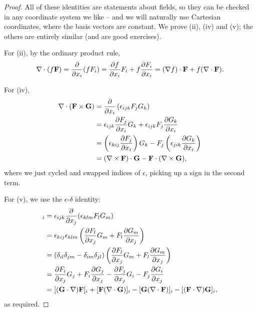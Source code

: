 \documentclass[a4paper]{scrartcl}
\begin{document}
\begin{proof}
	All of these identities are statements about fields, so they can be checked in any coordinate system we like -- and we will naturally use Cartesian coordinates, where the basis vectors are constant. We prove (ii), (iv) and (v); the others are entirely similar (and are good exercises).

	For (ii), by the ordinary product rule,
	$$
	\nabla \cdot (f \mathbf{F}) = \frac{\partial}{\partial x_i}(f F_i) = \frac{\partial f}{\partial x_i} F_i + f \frac{\partial F_i}{\partial x_i} = (\nabla f) \cdot \mathbf{F} + f (\nabla \cdot \mathbf{F}).
	$$

	For (iv),
	\begin{align*}
		\nabla \cdot (\mathbf{F} \times \mathbf{G}) &= \frac{\partial}{\partial x_i} \left(\epsilon_{ijk} F_j G_k\right) \\
		&= \epsilon_{ijk} \frac{\partial F_j}{\partial x_i} G_k + \epsilon_{ijk} F_j \frac{\partial G_k}{\partial x_i} \\
		&= \left(\epsilon_{kij} \frac{\partial F_j}{\partial x_i}\right) G_k - F_j \left(\epsilon_{jik} \frac{\partial G_k}{\partial x_i}\right) \\
		&= (\nabla \times \mathbf{F}) \cdot \mathbf{G} - \mathbf{F} \cdot (\nabla \times \mathbf{G}),
	\end{align*}
	where we just cycled and swapped indices of $\epsilon$, picking up a sign in the second term.

	For (v), we use the $\epsilon$-$\delta$ identity:
	\begin{align*}
		[\nabla \times (\vv{F} \times \vv{G})]_i &= \epsilon_{ijk} \frac{\partial}{\partial x_j} (\epsilon_{klm} F_l G_m) \\
		&= \epsilon_{kij}\epsilon_{klm} \left(\frac{\partial F_l}{\partial x_j} G_m + F_l \frac{\partial G_m}{\partial x_j}\right) \\
		&= (\delta_{il}\delta_{jm} - \delta_{im}\delta_{jl}) \left(\frac{\partial F_l}{\partial x_j} G_m + F_l \frac{\partial G_m}{\partial x_j}\right) \\
		&= \frac{\partial F_i}{\partial x_j} G_j + F_i \frac{\partial G_j}{\partial x_j} - \frac{\partial F_j}{\partial x_j} G_i - F_j \frac{\partial G_i}{\partial x_j} \\
		&= [(\vv{G} \cdot \nabla)\vv{F}]_i + [\vv{F}(\nabla \cdot \vv{G})]_i - [\vv{G}(\nabla \cdot \vv{F})]_i - [(\vv{F} \cdot \nabla)\vv{G}]_i,
	\end{align*}
	as required.
\end{proof}
\end{document}
